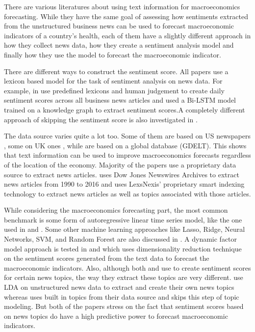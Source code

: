 \documentclass[11pt,a4paper]{article}
\begin{document}
There are various literatures about using text information for macroeconomics forecasting. While they have the same goal of assessing how sentiments extracted from the unstructured business news can be used to forecast macroeconomic indicators of a country's health, each of them have a slightly different approach in how they collect news data, how they create a sentiment analysis model and finally how they use the model to forecast the macroeconomic indicator.

There are different ways to construct the sentiment score. All papers use a lexicon based model for the task of sentiment analysis on news data. For example, in \cite{P1} \cite{P3} \cite{P4} \cite{P5} use predefined lexicons and human judgement to create daily sentiment scores across all business news articles and \cite{P7} used a Bi-LSTM model trained on a knowledge graph to extract sentiment scores.A completely different approach of skipping the sentiment score is also investigated in \cite{P6}.

The data source varies quite a lot too. Some of them are based on US newspapers \cite{P1} \cite{P3}, some on UK ones \cite{P6}, while \cite{P7} are based on a global database (GDELT). This shows that text information can be used to improve macroeconomics forecasts regardless of the location of the economy. Majority of the papers use a proprietary data source to extract news articles. \cite{P5} uses Dow Jones Newswires Archives to extract news articles from 1990 to 2016 and \cite{P4} uses LexsNexis’ proprietary smart indexing technology to extract news articles as well as topics associated with those articles. 

While considering the macroeconomics forecasting part, the most common benchmark is some form of autoregressive linear time series model, like the one used in \cite{P1} and \cite{P7}. Some other machine learning approaches like Lasso, Ridge, Neural Networks, SVM, and Random Forest are also discussed in \cite{P6}. A dynamic factor model approach is tested in \cite{P4} and \cite{P5} which uses dimensionality reduction technique on the sentiment scores generated from the text data to forecast the macroeconomic indicators. Also, although both \cite{P4} and \cite{P5} use to create sentiment scores for certain news topics, the way they extract these topics are very different. \cite{P5} use LDA on unstructured news data to extract and create their own news topics whereas \cite{P4} uses built in topics from their data source and skips this step of topic modeling. But both of the papers stress on the fact that sentiment scores based on news topics do have a high predictive power to forecast macroeconomic indicators.
\end{document}
